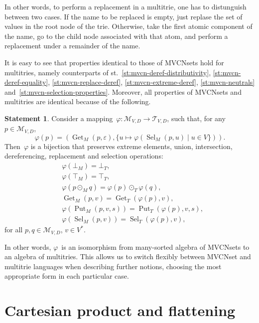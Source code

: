 \documentclass{article}
\theoremstyle{definition}
\newtheorem{St}{Statement}
\newcommand{\setcharmvcn}{M}
\newcommand{\setcharmt}{T}
\newcommand{\setsymbol}[3]{\mathcal{#1}_{#2,#3}}
\newcommand{\setmvcn}[2]{\setsymbol{\setcharmvcn}{#1}{#2}}
\newcommand{\setmt}[2]{\setsymbol{\setcharmt}{#1}{#2}}
\newcommand{\select}{\operatorname{Sel}}
\newcommand{\deref}{\operatorname{Get}}
\newcommand{\putval}{\operatorname{Put}}
\begin{document}
In other words, to perform a replacement in a multitrie, one has to distunguish
between two cases. If the name to be replaced is empty, just replase the set of
values in the root node of the trie. Otherwise, take the first atomic component
of the name, go to the child node associated with that atom, and perform a
replacement under a remainder of the name.

It is easy to see that properties identical to those of MVCNsets
hold for multitries, namely counterparts of
st.~\ref{st:mvcn-deref-distributivity},
\ref{st:mvcn-deref-equality},
\ref{st:mvcn-replace-deref},
\ref{st:mvcn-extreme-deref},
\ref{st:mvcn-neutrals}
and~\ref{st:mvcn-selection-properties}.
Moreover, all properties of MVCNsets and multitries are identical because
of the following.

\begin{St}\label{st:isomorph}
Consider a mapping~$\varphi: \setmvcn{V}{D} \to \setmt{V}{D}$, such that,
for any~$p\in \setmvcn{V}{D}$,
\[
  \varphi(p) = (
    \deref_\setcharmvcn(p, \varepsilon) ,
    \{ u \mapsto \varphi(\select_\setcharmvcn(p, u) \mid u\in V \})
  ) .
\]
Then~$\varphi$ is a bijection that preserves
extreme elements, union, intersection, dereferencing, replacement and selection
operations:
\begin{eqnarray*}
  & \varphi(\bot_{\setcharmvcn}) = \bot_{\setcharmt}, \\
  & \varphi(\top_{\setcharmvcn}) = \top_{\setcharmt}, \\
  & \varphi(p \mathbin{\odot_{\setcharmvcn}} q) =
      \varphi(p) \mathbin{\odot_{\setcharmt}} \varphi(q) , \\
  & \deref_{\setcharmvcn}(p, v) =
      \deref_{\setcharmt}(\varphi(p), v) , \\
  & \varphi(\putval_{\setcharmvcn}(p, v, s)) =
      \putval_{\setcharmt}(\varphi(p), v, s) , \\
  & \varphi(\select_{\setcharmvcn}(p, v)) =
      \select_{\setcharmt}(\varphi(p), v) ,
\end{eqnarray*}
for all $p,q \in \setmvcn{V}{D}$, $v \in V^\ast$.
\end{St}

In other words, $\varphi$~is an isomorphism from many-sorted algebra of
MVCNsets to an algebra of multitries.
This allows us to switch flexibly between MVCNset and multitrie
languages when describing further notions, choosing the most
appropriate form in each particular case.



\section{Cartesian product and flattening}
\end{document}
